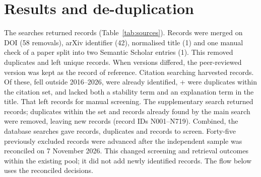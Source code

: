 \section{Results and de-duplication}
The searches returned \idTotal{} records (Table~\ref{tab:sources}). Records were merged on DOI (58 removals), arXiv identifier (42), normalised title (1) and one manual check of a paper split into two Semantic Scholar entries (1). This removed \dupRemoved{} duplicates and left \nUnique{} unique records. When versions differed, the peer-reviewed version was kept as the record of reference. Citation searching harvested \csHarvested{} records. Of these, \csYear{} fell outside 2016--2026, \csAlready{} were already identified, \the\numexpr\csDupWithin+\csDupManual\relax{} were duplicates within the citation set, and \csTitleFilter{} lacked both a stability term and an explanation term in the title. That left \csScreened{} records for manual screening. The supplementary search returned \spTotal{} records; \spDupWithin{} duplicates within the set and \spDupMain{} records already found by the main search were removed, leaving \spScreened{} new records (record IDs N001--N719). Combined, the database searches gave \dbAllId{} records, \dbAllDup{} duplicates and \dbAllScreened{} records to screen. Forty-five previously excluded records were advanced after the independent sample was reconciled on 7 November 2026. This changed screening and retrieval outcomes within the existing pool; it did not add newly identified records. The flow below uses the reconciled decisions.

